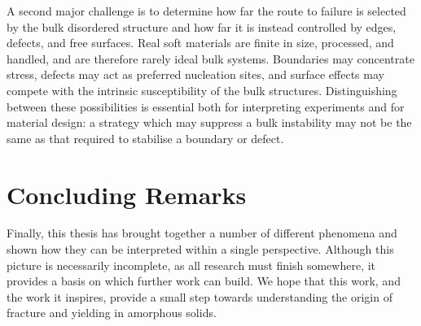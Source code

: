 A second major challenge is to determine how far the route to failure is selected by the bulk disordered structure and how far it is instead controlled by edges, defects, and free surfaces. Real soft materials are finite in size, processed, and handled, and are therefore rarely ideal bulk systems. Boundaries may concentrate stress, defects may act as preferred nucleation sites, and surface effects may compete with the intrinsic susceptibility of the bulk structures. Distinguishing between these possibilities is essential both for interpreting experiments and for material design: a strategy which may suppress a bulk instability may not be the same as that required to stabilise a boundary or defect.

\section{Concluding Remarks}
Finally, this thesis has brought together a number of different phenomena and shown how they can be interpreted within a single perspective. Although this picture is necessarily incomplete, as all research must finish somewhere, it provides a basis on which further work can build. We hope that this work, and the work it inspires, provide a small step towards understanding the origin of fracture and yielding in amorphous solids.
